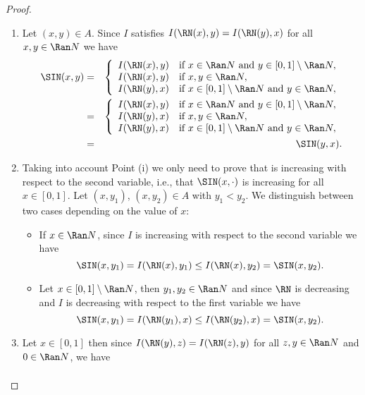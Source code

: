 \begin{proof}\hspace{0.5cm}
	\begin{enumerate}[label=(\roman*)]
		\item Let $(x,y) \in A$. Since $I$ satisfies $I(\RN(x),y)=I(\RN(y),x)$ for all $x,y \in \Ran N$ we have
		\begin{eqnarray*}
			\SIN(x,y)
			&=&
			\left\{ \begin{array}{ll}
				I(\RN(x),y) &   \text{if }   x \in \Ran N \text{ and } y \in [0,1] \setminus \Ran N, \\
				I(\RN(x),y) & \text{if } x,y \in \Ran N, \\
				I(\RN(y),x) & \text{if } x \in [0,1] \setminus \Ran N \text{ and } y \in \Ran N,
			\end{array} \right. \\
			&=&
			\left\{ \begin{array}{ll}
				I(\RN(x),y) &   \text{if }   x \in \Ran N \text{ and } y \in [0,1] \setminus \Ran N, \\
				I(\RN(y),x) & \text{if } x,y \in \Ran N, \\
				I(\RN(y),x) & \text{if } x \in [0,1] \setminus \Ran N \text{ and } y \in \Ran N,
			\end{array} \right. \\
			& = &\SIN(y,x).
		\end{eqnarray*}
		\item Taking into account Point (i) we only need to prove that \SIN is increasing with respect to the second variable, i.e., that $\SIN(x,\cdot)$ is increasing for all $x \in [0,1]$. Let $(x,y_1)$, $(x,y_2) \in A$ with $y_1 < y_2$. We distinguish between two cases depending on the value of $x$:
		\begin{itemize}
			\item If $x \in \Ran N$, since $I$ is increasing with respect to the second variable we have
			$$\SIN(x,y_1) = I(\RN(x),y_1) \leq I(\RN(x),y_2)=\SIN(x,y_2).$$
			\item Let $x \in [0,1] \setminus \Ran N$, then $y_1, y_2 \in \Ran N$  and since $\RN$ is decreasing and $I$ is decreasing with respect to the first variable we have
			$$\SIN(x,y_1) = I(\RN(y_1),x) \leq I(\RN(y_2),x) = \SIN(x,y_2).$$
		\end{itemize}
		\item Let $x \in [0,1]$ then since $I(\RN(y),z)=I(\RN(z),y)$ for all $z,y \in \Ran N$ and $0 \in \Ran N$, we have
		\begin{eqnarray*}

\end{eqnarray*}
\end{enumerate}
\end{proof}
